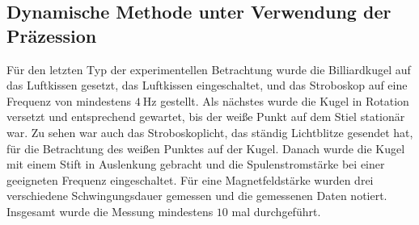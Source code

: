 \subsection{Dynamische Methode unter Verwendung der Präzession}
Für den letzten Typ der experimentellen Betrachtung wurde die Billiardkugel auf das Luftkissen gesetzt, das Luftkissen eingeschaltet, und das Stroboskop auf eine Frequenz von mindestens $\SI{4}{\Hz}$ gestellt. Als nächstes wurde die Kugel in Rotation versetzt und entsprechend gewartet, bis der weiße Punkt auf dem Stiel stationär war. Zu sehen war auch das Stroboskoplicht, das ständig Lichtblitze gesendet hat, für die Betrachtung des weißen Punktes auf der Kugel. Danach wurde die Kugel mit einem Stift in Auslenkung gebracht und die Spulenstromstärke bei einer geeigneten Frequenz eingeschaltet. Für eine Magnetfeldstärke wurden drei verschiedene Schwingungsdauer gemessen und die gemessenen Daten notiert. Insgesamt wurde die Messung mindestens $10$ mal durchgeführt.
